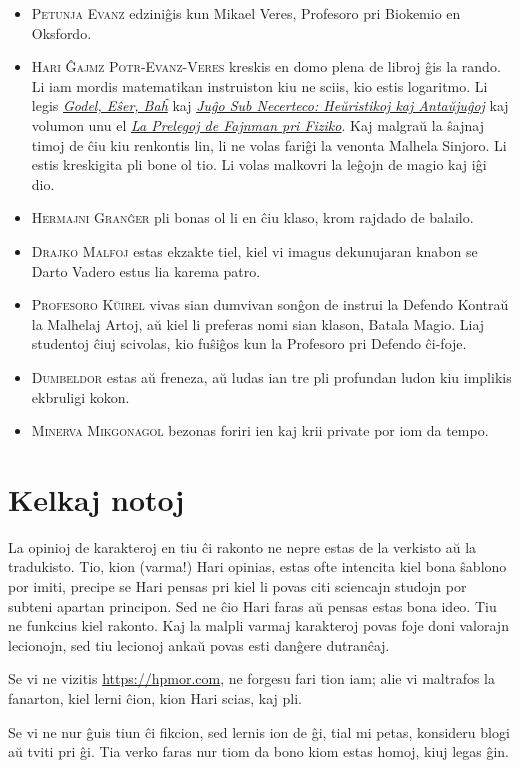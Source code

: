 \begin{itemize}
\item \textsc{Petunja Evanz} edziniĝis kun Mikael Veres, Profesoro pri Biokemio en Oksfordo.
\item \textsc{Hari Ĝajmz Potr-Evanz-Veres} kreskis en domo plena de libroj ĝis la rando.
  Li iam mordis matematikan instruiston kiu ne sciis, kio estis logaritmo.
  Li legis \href{https://books.google.com/books?vid=ISBN9780465026562}{\emph{Godel, Eŝer, Baĥ}}
  kaj \href{https://books.google.com/books?vid=ISBN9780521284141}{\emph{Juĝo Sub Necerteco: Heŭristikoj kaj Antaŭjuĝoj}}
  kaj volumon unu el \href{https://books.google.com/books?vid=ISBN9780201021158}{\emph{La Prelegoj de Fajnman pri Fiziko}}.
  Kaj malgraŭ la ŝajnaj timoj de ĉiu kiu renkontis lin, li ne volas fariĝi la venonta Malhela Sinjoro.
  Li estis kreskigita pli bone ol tio.
  Li volas malkovri la leĝojn de magio kaj iĝi dio.
\item \textsc{Hermajni Granĝer} pli bonas ol li en ĉiu klaso, krom rajdado de balailo.
\item \textsc{Drajko Malfoj} estas ekzakte tiel, kiel vi imagus dekunujaran knabon se Darto Vadero estus lia karema patro.
\item \textsc{Profesoro Kŭirel} vivas sian dumvivan sonĝon de instrui la Defendo Kontraŭ la Malhelaj Artoj, aŭ kiel li preferas nomi sian klason, Batala Magio.
  Liaj studentoj ĉiuj scivolas, kio fuŝiĝos kun la Profesoro pri Defendo ĉi-foje.
\item \textsc{Dumbeldor} estas aŭ freneza, aŭ ludas ian tre pli profundan ludon kiu implikis ekbruligi kokon.
\item \textsc{Minerva Mikgonagol} bezonas foriri ien kaj krii private por iom da tempo.
\end{itemize}

%
%

\section*{Kelkaj notoj}

La opinioj de karakteroj en tiu ĉi rakonto ne nepre estas de la verkisto aŭ la tradukisto.
Tio, kion (varma!) Hari opinias, estas ofte intencita kiel bona ŝablono por imiti, precipe se Hari pensas pri kiel li povas citi sciencajn studojn por subteni apartan principon.
Sed ne ĉio Hari faras aŭ pensas estas bona ideo.
Tiu ne funkcius kiel rakonto.
Kaj la malpli varmaj karakteroj povas foje doni valorajn lecionojn, sed tiu lecionoj ankaŭ povas esti danĝere dutranĉaj.

Se vi ne vizitis \url{https://hpmor.com}, ne forgesu fari tion iam; alie vi maltrafos la fanarton, kiel lerni ĉion, kion Hari scias, kaj pli.

Se vi ne nur ĝuis tiun ĉi fikcion, sed lernis ion de ĝi, tial mi petas, konsideru blogi aŭ tviti pri ĝi.
Tia verko faras nur tiom da bono kiom estas homoj, kiuj legas ĝin.

